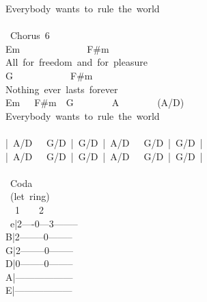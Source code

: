 {Everybody\ wants\ to\ rule\ the\ world\\
\\
\lbrack\ Chorus\ 6\rbrack\\
Em\ \ \ \ \ \ \ \ \ \ \ \ \ \ F\#m\\
All\ for\ freedom\ and\ for\ pleasure\\
G\ \ \ \ \ \ \ \ \ \ \ \ F\#m\\
Nothing\ ever\ lasts\ forever\\
Em\ \ \ F\#m\ \ G\ \ \ \ \ \ \ \ A\ \ \ \ \ \ \ \ (A/D)\\
Everybody\ wants\ to\ rule\ the\ world\\
\\
|\ A/D\ \ \ G/D\ |\ G/D\ |\ A/D\ \ \ G/D\ |\ G/D\ |\\
|\ A/D\ \ \ G/D\ |\ G/D\ |\ A/D\ \ \ G/D\ |\ G/D\ |\\
\\
\lbrack\ Coda\rbrack\\
\ (let\ ring)\\
\ \ 1\ \ \ \ 2\ \\\
e|2----0---3--------\\
B|2--------0--------\\
G|2--------0--------\\
D|0--------0--------\\
A|------------------\\
E|------------------}
